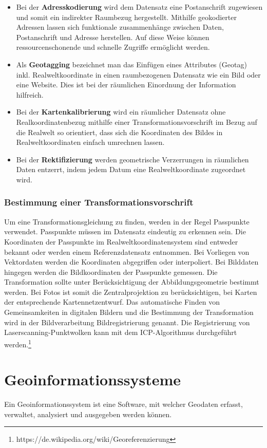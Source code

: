 \documentclass[11pt,ceqn]{book}
\begin{document}
\begin{itemize}
\item Bei der \textbf{Adresskodierung} wird dem Datensatz eine Postanschrift zugewiesen und somit ein indirekter Raumbezug hergestellt. Mithilfe geokodierter Adressen lassen sich funktionale zusammenhänge zwischen Daten, Postanschrift und Adresse herstellen. Auf diese Weise können ressourcenschonende und schnelle Zugriffe ermöglicht werden.
\item Als \textbf{Geotagging} bezeichnet man das Einfügen eines Attributes (Geotag) inkl. Realweltkoordinate in einen raumbezogenen Datensatz wie ein Bild oder eine Website. Dies ist bei der räumlichen Einordnung der Information hilfreich.
\item Bei der \textbf{Kartenkalibrierung} wird ein räumlicher Datensatz ohne Realkoordinatenbezug mithilfe einer Transformationsvorschrift im Bezug auf die Realwelt so orientiert, dass sich die Koordinaten des Bildes in Realweltkoordinaten einfach umrechnen lassen.
\item Bei der \textbf{Rektifizierung} werden geometrische Verzerrungen in räumlichen Daten entzerrt, indem jedem Datum eine Realweltkoordinate zugeordnet wird.
\end{itemize}


\subsubsection{Bestimmung einer Transformationsvorschrift}

Um eine Transformationsgleichung zu finden, werden in der Regel Passpunkte verwendet. Passpunkte müssen im Datensatz eindeutig zu erkennen sein. Die Koordinaten der Passpunkte im Realweltkoordinatensystem sind entweder bekannt oder werden einem Referenzdatensatz entnommen. Bei Vorliegen von Vektordaten werden die Koordinaten abgegriffen oder interpoliert. Bei Bilddaten hingegen werden die Bildkoordinaten der Passpunkte gemessen. Die Transformation sollte unter Berücksichtigung der Abbildungsgeometrie bestimmt werden. Bei Fotos ist somit die Zentralprojektion zu berücksichtigen, bei Karten der entsprechende Kartennetzentwurf. Das automatische Finden von Gemeinsamkeiten in digitalen Bildern und die Bestimmung der Transformation wird in der Bildverarbeitung Bildregistrierung genannt. Die Registrierung von Laserscanning-Punktwolken kann mit dem ICP-Algorithmus durchgeführt werden.\footnote{https://de.wikipedia.org/wiki/Georeferenzierung}


\section{Geoinformationssysteme}
Ein Geoinformationssystem ist eine Software, mit welcher Geodaten erfasst, verwaltet, analysiert und ausgegeben werden können.
\end{document}
